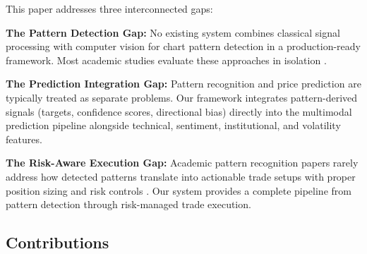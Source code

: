 \documentclass[12pt,a4paper]{article}
\begin{document}
This paper addresses three interconnected gaps:

\textbf{The Pattern Detection Gap:} No existing system combines classical signal processing with computer vision for chart pattern detection in a production-ready framework. Most academic studies evaluate these approaches in isolation \cite{lo2000foundations, tsantekidis2017forecasting}.

\textbf{The Prediction Integration Gap:} Pattern recognition and price prediction are typically treated as separate problems. Our framework integrates pattern-derived signals (targets, confidence scores, directional bias) directly into the multimodal prediction pipeline alongside technical, sentiment, institutional, and volatility features.

\textbf{The Risk-Aware Execution Gap:} Academic pattern recognition papers rarely address how detected patterns translate into actionable trade setups with proper position sizing and risk controls \cite{lopez2018advances}. Our system provides a complete pipeline from pattern detection through risk-managed trade execution.

\subsection{Contributions}
\end{document}
